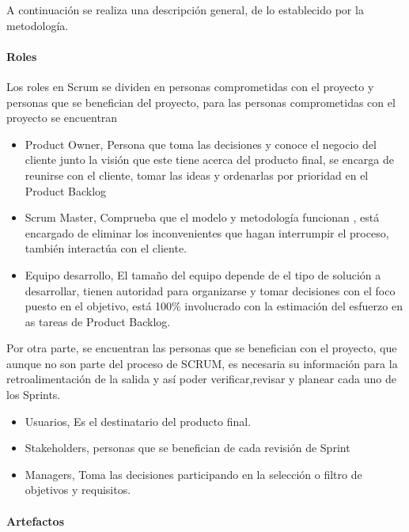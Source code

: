 A continuación se realiza una descripción general, de lo establecido por la metodología. 

\paragraph{Roles}
Los roles en Scrum se dividen en personas comprometidas con el proyecto y personas que se benefician del proyecto, para las personas comprometidas con el proyecto se encuentran
\begin{itemize}
    \item Product Owner, Persona que toma las decisiones y conoce el negocio del cliente junto la visión que este tiene acerca del producto final, se encarga de reunirse con el cliente, tomar las ideas y ordenarlas por prioridad en el Product Backlog
     \item Scrum Master, Comprueba que el modelo y metodología funcionan , está encargado de eliminar los inconvenientes que hagan interrumpir el proceso, también interactúa con el cliente.
     \item Equipo desarrollo, El tamaño del equipo depende de el tipo de solución a desarrollar, tienen autoridad para organizarse y tomar decisiones con el foco puesto en el objetivo, está 100\% involucrado con la estimación del esfuerzo en as tareas de Product Backlog.
\end{itemize}

Por otra parte, se encuentran las personas que se benefician con el proyecto, que aunque no son parte del proceso de SCRUM, es necesaria su información para la retroalimentación de la salida y así poder verificar,revisar y planear cada uno de los Sprints.
\begin{itemize}
    \item Usuarios, Es el destinatario del producto final. 
    \item Stakeholders, personas que se benefician de cada revisión de Sprint
    \item Managers, Toma las decisiones participando en la selección o filtro de objetivos y requisitos. 
\end{itemize}

\paragraph{Artefactos}

